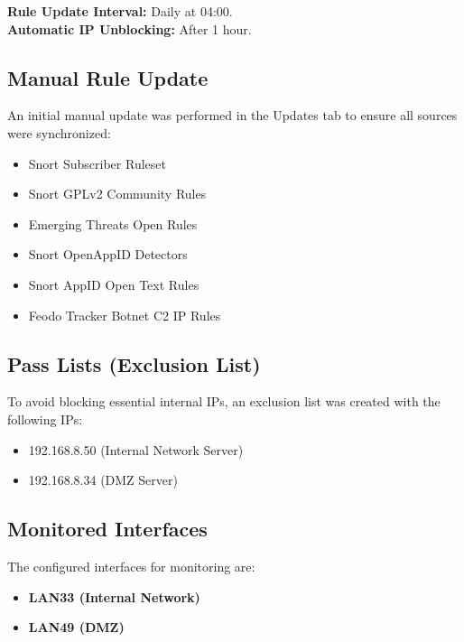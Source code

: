 \documentclass[12pt]{report}
\begin{document}
\textbf{Rule Update Interval:} Daily at 04:00.\\
\textbf{Automatic IP Unblocking:} After 1 hour.

\subsection*{Manual Rule Update}

An initial manual update was performed in the Updates tab to ensure all sources were synchronized:

\begin{itemize}
    \item Snort Subscriber Ruleset
    \item Snort GPLv2 Community Rules
    \item Emerging Threats Open Rules
    \item Snort OpenAppID Detectors
    \item Snort AppID Open Text Rules
    \item Feodo Tracker Botnet C2 IP Rules
\end{itemize}

\subsection*{Pass Lists (Exclusion List)}

To avoid blocking essential internal IPs, an exclusion list was created with the following IPs:
\begin{itemize}
    \item 192.168.8.50 (Internal Network Server)
    \item 192.168.8.34 (DMZ Server)
\end{itemize}

\subsection*{Monitored Interfaces}

The configured interfaces for monitoring are:

\begin{itemize}
    \item \textbf{LAN33 (Internal Network)}
    \item \textbf{LAN49 (DMZ)}
\end{itemize}
\end{document}
